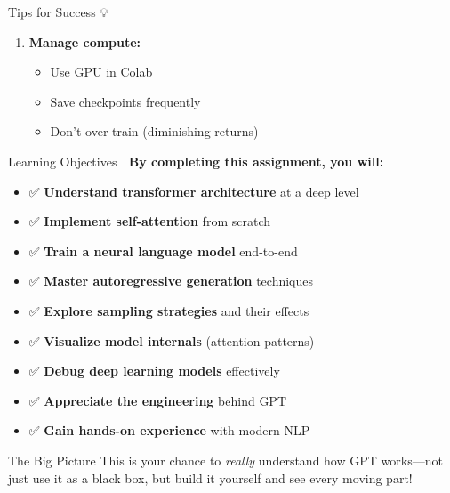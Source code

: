 \documentclass[aspectratio=169]{beamer}
\begin{document}
\begin{frame}{Tips for Success 💡}
\begin{enumerate}
    \item \textbf{Manage compute:}
    \begin{itemize}
        \item Use GPU in Colab
        \item Save checkpoints frequently
        \item Don't over-train (diminishing returns)
    \end{itemize}
\end{enumerate}
\end{frame}

\begin{frame}{Learning Objectives 🎯}
\textbf{By completing this assignment, you will:}

\vspace{0.5em}

\begin{itemize}
    \item ✅ \textbf{Understand transformer architecture} at a deep level
    \item ✅ \textbf{Implement self-attention} from scratch
    \item ✅ \textbf{Train a neural language model} end-to-end
    \item ✅ \textbf{Master autoregressive generation} techniques
    \item ✅ \textbf{Explore sampling strategies} and their effects
    \item ✅ \textbf{Visualize model internals} (attention patterns)
    \item ✅ \textbf{Debug deep learning models} effectively
    \item ✅ \textbf{Appreciate the engineering} behind GPT
    \item ✅ \textbf{Gain hands-on experience} with modern NLP
\end{itemize}

\vspace{1em}

\begin{block}{The Big Picture}
This is your chance to \textit{really} understand how GPT works—not just use it as a black box, but build it yourself and see every moving part!
\end{block}
\end{frame}

\end{document}

